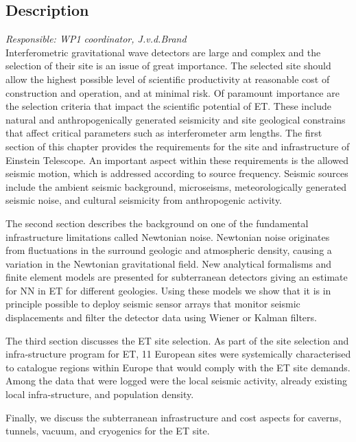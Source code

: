 \subsection{Description}
%
%
\emph{
Responsible:  WP1 coordinator, J.v.d.Brand  \\
}
Interferometric gravitational wave detectors are large and complex and the selection of their site is an issue of great importance. The selected site should allow the highest possible level of scientific productivity at reasonable cost of construction and operation, and at minimal risk. Of paramount importance are the selection criteria that impact the scientific potential of ET. These include natural and anthropogenically generated seismicity and site geological constrains that affect critical parameters such as interferometer arm lengths. The first section of this chapter provides the requirements for the site and infrastructure of Einstein Telescope. An important aspect within these requirements is the allowed seismic motion, which is addressed according to source frequency. Seismic sources include the ambient seismic background, microseisms, meteorologically generated seismic noise, and cultural seismicity from anthropogenic activity. 

The second section describes the background on one of the fundamental infrastructure limitations called Newtonian noise. Newtonian noise originates from fluctuations in the surround geologic and atmospheric density, causing a variation in the Newtonian gravitational field. New analytical formalisms and finite element models are presented for subterranean detectors giving an estimate for NN in ET for different geologies. Using these models we show that it is in principle possible to deploy seismic sensor arrays that monitor seismic displacements and filter the detector data using Wiener or Kalman filters.

The third section discusses the ET site selection. As part of the site selection and infra-structure program for ET, 11 European sites were systemically characterised to catalogue regions within Europe that would comply with the ET site demands. Among the data that were logged were the local seismic activity, already existing local infra-structure, and population density. 

Finally, we discuss the subterranean infrastructure and cost aspects for caverns, tunnels, vacuum, and cryogenics for the ET site.
\FloatBarrier
